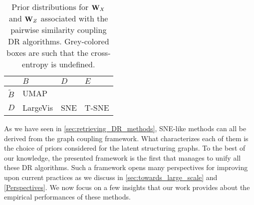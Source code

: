 \begin{table}[]
    \caption{Prior distributions for $\mathbf{W}_{X}$ and $\mathbf{W}_{Z}$ associated with the pairwise similarity coupling DR algorithms. Grey-colored boxes are such that the cross-entropy is undefined.}
    \begin{center}
    \begin{small}
    \begin{sc}
    \centering
    \renewcommand{\arraystretch}{2}
    \begin{NiceTabular}{|W{c}{1cm}|W{c}{1.8cm}|W{c}{1.8cm}|W{c}{1.8cm}|}
    \hline
     & $B$ & $D$ & $E$ \\
    \hline
    $\widetilde{B}$ & UMAP &  &  \\
    \hline
    $D$ & LargeVis & SNE & T-SNE\\
    \hline
    \end{NiceTabular}
    \label{tableau_priors}
    \end{sc}
    \end{small}
    \end{center}
    \label{priors_methods}
\end{table}

As we have seen in \cref{sec:retrieving_DR_methods}, SNE-like methods can all be derived from the graph coupling framework.  What characterizes each of them is the choice of priors considered for the latent structuring graphs. To the best of our knowledge, the presented framework is the first that manages to unify all these DR algorithms. Such a framework opens many perspectives for improving upon current practices as we discuss in \cref{sec:towards_large_scale} and \cref{Perspectives}. 
We now focus on a few insights that our work provides about the empirical performances of these methods. 

